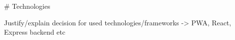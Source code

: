 \begin{markdown}

# Technologies

Justify/explain decision for used technologies/frameworks -> PWA, React, Express backend etc
  
\end{markdown}